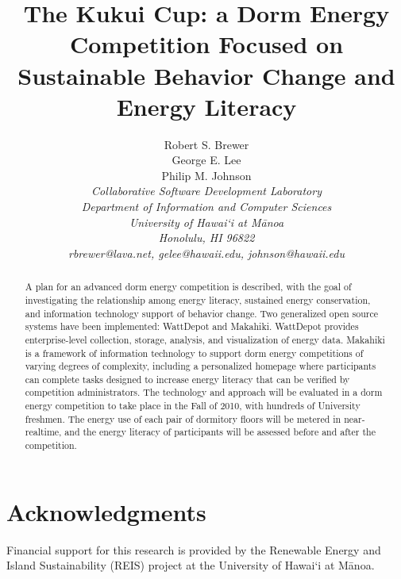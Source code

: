 \documentclass[conference,peerreview]{IEEEtran}
\begin{document}
\title{The Kukui Cup: a Dorm Energy Competition Focused on Sustainable Behavior Change and Energy Literacy}

\author{Robert S. Brewer\\
        George E. Lee \\
        Philip M. Johnson\\
\em     Collaborative Software Development Laboratory\\
        Department of Information and Computer Sciences\\
        University of Hawai`i at M\=anoa\\
        Honolulu, HI 96822\\
        rbrewer@lava.net, gelee@hawaii.edu, johnson@hawaii.edu\\
}


\IEEEpeerreviewmaketitle

\begin{abstract}  %
A plan for an advanced dorm energy competition is described, with the goal of
investigating the relationship among energy literacy, sustained energy
conservation, and information technology support of behavior change. Two
generalized open source systems have been implemented: WattDepot and Makahiki.
WattDepot provides enterprise-level collection, storage, analysis, and
visualization of energy data. Makahiki is a framework of information technology
to support dorm energy competitions of varying degrees of complexity,
including a personalized homepage where participants can complete tasks
designed to increase energy literacy that can be verified by competition
administrators. The technology and approach will be evaluated in a dorm energy
competition to take place in the Fall of 2010, with hundreds of University
freshmen. The energy use of each pair of dormitory floors will be metered in
near-realtime, and the energy literacy of participants will be assessed before
and after the competition.
\end{abstract}







\section{Acknowledgments}

Financial support for this research is provided by the Renewable Energy and
Island Sustainability (REIS) project at the University of Hawai`i at M\=anoa.



\end{document}
